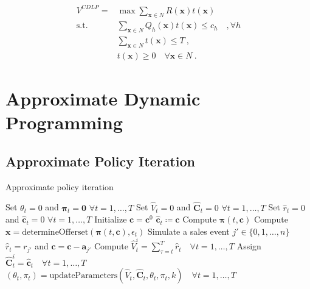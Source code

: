 \begin{align}
	V^{CDLP} = & \max \sum_{\boldsymbol{x}\in N} R(\boldsymbol{x}) t(\boldsymbol{x})\\
	\text{s.t. } & \sum_{\boldsymbol{x}\in N} Q_h(\boldsymbol{x}) t(\boldsymbol{x}) \leq c_h \quad, \forall h\\
	& \sum_{\boldsymbol{x}\in N} t(\boldsymbol{x}) \leq T~,\\
	& t(\boldsymbol{x}) \geq 0 \quad \forall \boldsymbol{x} \in N~.
\end{align}

\section{Approximate Dynamic Programming}

\subsection{Approximate Policy Iteration}

\begin{algorithm}
	\caption{Approximate policy iteration}\label{alg-API}
	\begin{algorithmic}[1]
		\State Set $\theta_t = 0$ and $\mathbf{\pi}_t = \mathbf{0}$ $\forall t = 1, \dots, T$
		\State Set $\hat{V}_t = 0$ and $\mathbf{\hat{C}}_t = 0$ $\forall t = 1, \dots, T$
		\State Set $\hat{r}_t = 0$ and $\mathbf{\hat{c}}_t = 0$ $\forall t = 1, \dots, T$
		\State Initialize $\mathbf{c} = \mathbf{c}^0$
		\State $\mathbf{\hat{c}}_t \coloneqq \mathbf{c}$
		\State Compute $\mathbf{\pi}(t, \mathbf{c})$ \label{alg-API-calcPi}
		\State Compute $\mathbf{x} = \text{determineOfferset}(\mathbf{\pi}(t, \mathbf{c}), \epsilon_t)$
		\State Simulate a sales event $j' \in \{0, 1, \dots, n\}$
		\State $\hat{r}_t = r_{j'}$ and $\mathbf{c} = \mathbf{c} - \mathbf{a}_{j'}$
		\EndIf
		\EndFor
		\State Compute $\hat{V}_t^i = \sum_{\tau = t}^{T}\hat{r}_t \quad \forall t = 1, \dots, T$
		\State Assign $\mathbf{\hat{C}}_t^i = \mathbf{\hat{c}}_t \quad \forall t = 1, \dots, T$
		\EndFor
		\State $\left(\theta_t, \pi_t \right) = \text{updateParameters}\left(\hat{V}_t, \mathbf{\hat{C}}_t, \theta_t, \pi_t, k\right) \quad \forall t = 1, \dots, T$ \label{alg-API-updateParam}
		\EndFor
	\end{algorithmic}
\end{algorithm}

